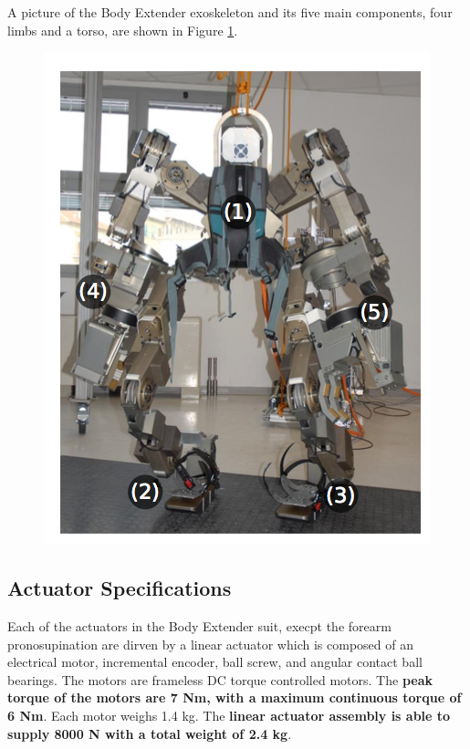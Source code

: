A picture of the Body Extender exoskeleton and its five main components, four limbs and a torso, are shown in Figure \ref{fig:bodyExt}.
\begin{figure}[thpb]
\centering
\includegraphics[width=3.in]{exos/figs/bodyExt/bodyExt}
  \caption{}
  \vspace{-0.2in}
 \label{fig:bodyExt}   
 \end{figure}

\subsection{Actuator Specifications}
 
 Each of the actuators in the Body Extender suit, execpt the forearm pronosupination are dirven by a linear actuator which is composed of an electrical motor, incremental encoder, ball screw, and angular contact ball bearings.  The motors are frameless DC torque controlled motors.  The {\bf peak torque of the motors are 7 Nm, with a maximum continuous torque of 6 Nm}.  Each motor weighs 1.4 kg.  The {\bf linear actuator assembly is able to supply 8000 N with a total weight of 2.4 kg}.
 
